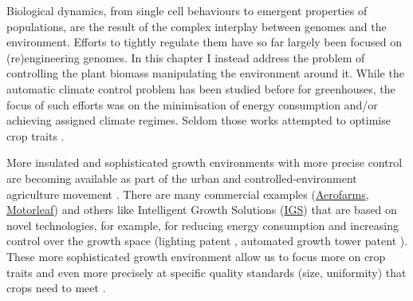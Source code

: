 Biological dynamics, from single cell behaviours to emergent properties of
populations, are the result of the complex interplay between genomes and the
environment. Efforts to tightly regulate them have so far largely been focused
on (re)engineering genomes. In this chapter I instead address the problem of
controlling the plant biomass manipulating the environment around it. While the
automatic climate control problem has been studied before for greenhouses, the
focus of such efforts was on the minimisation of energy consumption and/or
achieving assigned climate regimes. Seldom those works attempted to optimise
crop traits \citep{Chalabi1996, udinktenCate1983, Challa_1990, Aaslyng2003}.

More insulated and sophisticated growth environments with more precise control
are becoming available as part of the urban and controlled-environment
agriculture movement \citep{mok_strawberry_2014, despommier_farming_2013}. There
are many commercial examples (\href{https://aerofarms.com/}{Aerofarms},
\href{https://motorleaf.com/}{Motorleaf}) and others like Intelligent Growth
Solutions (\href{https://www.intelligentgrowthsolutions.com/}{IGS}) that are
based on novel technologies, for example, for reducing energy consumption and
increasing control over the growth space (lighting patent
\cite{aykroyd_novel_2016}, automated growth tower patent
\cite{aykroyd_automated_2018}). These more sophisticated growth environment
allow us to focus more on crop traits and even more precisely at specific
quality standards (size, uniformity) that crops need to meet \citep[see for
example EU marketing standards on fruit and vegetables;][]{eu-543-2011}.

